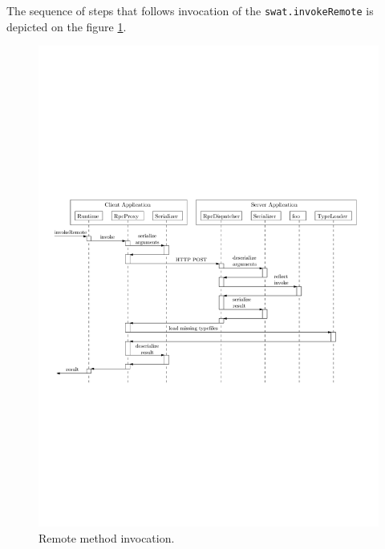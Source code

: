 \documentclass[12pt,a4paper]{report}
\begin{document}
The sequence of steps that follows invocation of the \texttt{swat.invokeRemote} is depicted on the figure \ref{Rpc}.

\begin{figure}[ht]
  \centering
	\includegraphics[width=\linewidth,height=\textheight,keepaspectratio]{img/Rpc.pdf}
	\caption{Remote method invocation.}
	\label{Rpc}
\end{figure}
\end{document}
